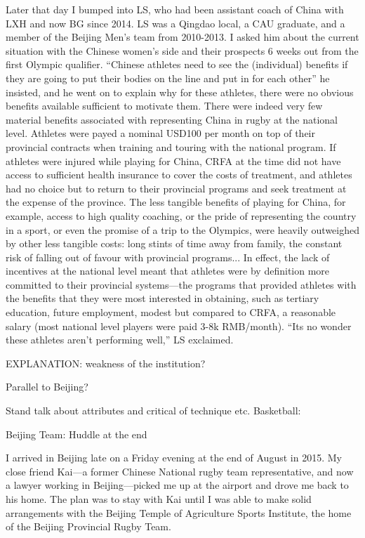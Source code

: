 Later that day I bumped into LS, who had been assistant coach of China with LXH and now BG since 2014.  LS was a Qingdao local, a CAU graduate, and a member of the Beijing Men's team from 2010-2013.  I asked him about the current situation with the Chinese women's side and their prospects 6 weeks out from the first Olympic qualifier.  ``Chinese athletes need to see the (individual) benefits if they are going to put their bodies on the line and put in for each other'' he insisted, and he went on to explain why for these athletes, there were no obvious benefits available sufficient to motivate them.  There were indeed very few material benefits associated with representing China in rugby at the national level.  Athletes were payed a nominal USD100 per month on top of their provincial contracts when training and touring with the national program.  If athletes were injured while playing for China, CRFA at the time did not have access to sufficient health insurance to cover the costs of treatment, and athletes had no choice but to return to their provincial programs and seek treatment at the expense of the province.  The less tangible benefits of playing for China, for example, access to high quality coaching, or the pride of representing the country in a sport, or even the promise of a trip to the Olympics, were heavily outweighed by other less tangible costs: long stints of time away from family, the constant risk of falling out of favour with provincial programs...  In effect, the lack of incentives at the national level meant that athletes were by definition more committed to their provincial systems---the programs that provided athletes with the benefits that they were most interested in obtaining, such as tertiary education, future employment, modest but compared to CRFA, a reasonable salary (most national level players were paid 3-8k RMB/month). ``Its no wonder these athletes aren't performing well,'' LS exclaimed.

EXPLANATION: weakness of the institution?

Parallel to Beijing?


Stand talk about attributes and critical of technique etc.
Basketball:





Beijing Team: Huddle at the end






I arrived in Beijing late on a Friday evening at the end of August in 2015.  My close friend Kai---a former Chinese National rugby team representative, and now a lawyer working in Beijing---picked me up at the airport and drove me back to his home.  The plan was to stay with Kai until I was able to make solid arrangements with the Beijing Temple of Agriculture Sports Institute, the home of the Beijing Provincial Rugby Team.

